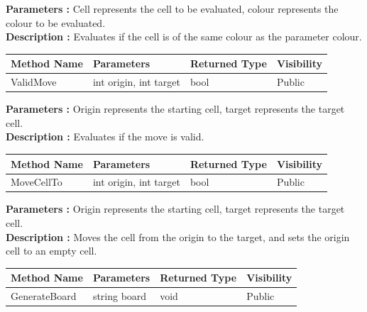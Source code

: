 \documentclass[12pt]{article}
\begin{document}
    \textbf{Parameters :} Cell represents the cell to be evaluated, colour represents the colour to be evaluated.
    \\

    \textbf{Description :} Evaluates if the cell is of the same colour as the parameter colour.

    \begin{table}[H]
        \begin{tabular}{|l|l|l|l|}
            \hline
            \rowcolor[HTML]{EFEFEF}
            \cellcolor[HTML]{EFEFEF}\textbf{Method Name} & \textbf{Parameters}    & \textbf{Returned Type} & \textbf{Visibility} \\ \hline
            ValidMove                                    & int origin, int target & bool                   & Public              \\ \hline
        \end{tabular}
    \end{table}

    \textbf{Parameters :} Origin represents the starting cell, target represents the target cell.
    \\

    \textbf{Description :} Evaluates if the move is valid.

    \begin{table}[H]
        \begin{tabular}{|l|l|l|l|}
            \hline
            \rowcolor[HTML]{EFEFEF}
            \cellcolor[HTML]{EFEFEF}\textbf{Method Name} & \textbf{Parameters}    & \textbf{Returned Type} & \textbf{Visibility} \\ \hline
            MoveCellTo                                   & int origin, int target & bool                   & Public              \\ \hline
        \end{tabular}
    \end{table}

    \textbf{Parameters :} Origin represents the starting cell, target represents the target cell.
    \\

    \textbf{Description :} Moves the cell from the origin to the target, and sets the origin cell to an empty cell.

    \begin{table}[H]
        \begin{tabular}{|l|l|l|l|}
            \hline
            \rowcolor[HTML]{EFEFEF}
            \cellcolor[HTML]{EFEFEF}\textbf{Method Name} & \textbf{Parameters} & \textbf{Returned Type} & \textbf{Visibility} \\ \hline
            GenerateBoard                                & string board        & void                   & Public              \\ \hline
        \end{tabular}
    \end{table}
\end{document}
